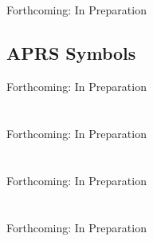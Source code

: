 \documentclass{report}
\begin{document}
% 
\chapter{}
Forthcoming: In Preparation

% 
\chapter{APRS Symbols}
Forthcoming: In Preparation

%
\part{}
Forthcoming: In Preparation

%
\part{}
Forthcoming: In Preparation

%
\part{}
Forthcoming: In Preparation
\end{document}
